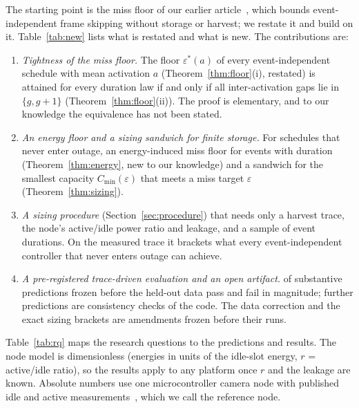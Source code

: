 \documentclass[lettersize,journal]{IEEEtran}
\theoremstyle{definition}
\theoremstyle{remark}
\newcommand{\eps}{\varepsilon}
\begin{document}
The starting point is the miss floor of our earlier article~\cite[Thms.~4--5]{deep3_jiot2026}, which bounds event-independent frame skipping without storage or harvest; we restate it and build on it. Table~\ref{tab:new} lists what is restated and what is new. The contributions are:
\begin{enumerate}
\item \emph{Tightness of the miss floor.} The floor $\eps^*(a)$ of every event-independent schedule with mean activation $a$ (Theorem~\ref{thm:floor}(i), restated) is attained for every duration law if and only if all inter-activation gaps lie in $\{g,g+1\}$ (Theorem~\ref{thm:floor}(ii)). The proof is elementary, and to our knowledge the equivalence has not been stated.
\item \emph{An energy floor and a sizing sandwich for finite storage.} For schedules that never enter outage, an energy-induced miss floor for events with duration (Theorem~\ref{thm:energy}, new to our knowledge) and a sandwich for the smallest capacity $C_{\min}(\eps)$ that meets a miss target $\eps$ (Theorem~\ref{thm:sizing}).
\item \emph{A sizing procedure} (Section~\ref{sec:procedure}) that needs only a harvest trace, the node's active/idle power ratio and leakage, and a sample of event durations. On the measured trace it brackets what every event-independent controller that never enters outage can achieve.
\item \emph{A pre-registered trace-driven evaluation and an open artifact.} \nSubstPass{} of \nSubst{} substantive predictions frozen before the held-out data pass and \nSubstFail{} fail in magnitude; \nCons{} further predictions are consistency checks of the code. The data correction and the exact sizing brackets are amendments frozen before their runs.
\end{enumerate}
Table~\ref{tab:rq} maps the research questions to the predictions and results. The node model is dimensionless (energies in units of the idle-slot energy, $r$ = active/idle ratio), so the results apply to any platform once $r$ and the leakage are known. Absolute numbers use one microcontroller camera node with published idle and active measurements~\cite{moosmann2025tinyissimo}, which we call the reference node.
\end{document}
